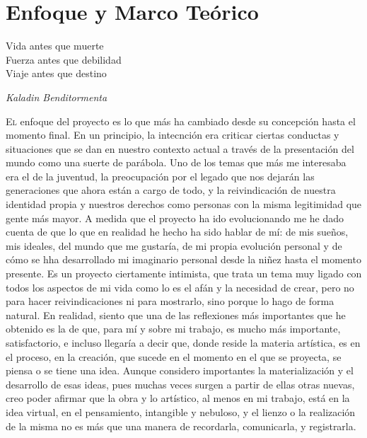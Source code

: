 \documentclass[twoside]{article}
\begin{document}
\newpage
\hypertarget{enfoque}{%
  \section{Enfoque y Marco Teórico}\label{enfoque}}
\epigraph{Vida antes que muerte\\Fuerza antes que debilidad\\Viaje antes que destino}{\textit{Kaladin Benditormenta}}
\begin{multicols}{2}

  \lettrine[nindent=0em,lines=3]{E}l enfoque del proyecto es lo que más ha cambiado desde su concepción
  hasta el momento final. En un principio, la intecnción era criticar
  ciertas conductas y situaciones que se dan en nuestro contexto actual a
  través de la presentación del mundo como una suerte de parábola. Uno de
  los temas que más me interesaba era el de la juventud, la preocupación
  por el legado que nos dejarán las generaciones que ahora están a cargo
  de todo, y la reivindicación de nuestra identidad propia y nuestros
  derechos como personas con la misma legitimidad que gente más mayor. A
  medida que el proyecto ha ido evolucionando me he dado cuenta de que lo
  que en realidad he hecho ha sido hablar de mí: de mis sueños, mis
  ideales, del mundo que me gustaría, de mi propia evolución personal y de
  cómo se hha desarrollado mi imaginario personal desde la niñez hasta el
  momento presente. Es un proyecto ciertamente intimista, que trata un
  tema muy ligado con todos los aspectos de mi vida como lo es el afán y
  la necesidad de crear, pero no para hacer reivindicaciones ni para
  mostrarlo, sino porque lo hago de forma natural. En realidad, siento que
  una de las reflexiones más importantes que he obtenido es la de que,
  para mí y sobre mi trabajo, es mucho más importante, satisfactorio, e
  incluso llegaría a decir que, donde reside la materia artística, es en
  el proceso, en la creación, que sucede en el momento en el que se
  proyecta, se piensa o se tiene una idea. Aunque considero importantes la
  materialización y el desarrollo de esas ideas, pues muchas veces surgen
  a partir de ellas otras nuevas, creo poder afirmar que la obra y lo
  artístico, al menos en mi trabajo, está en la idea virtual, en el
  pensamiento, intangible y nebuloso, y el lienzo o la realización de la
  misma no es más que una manera de recordarla, comunicarla, y
  registrarla.


\end{multicols}
\end{document}
